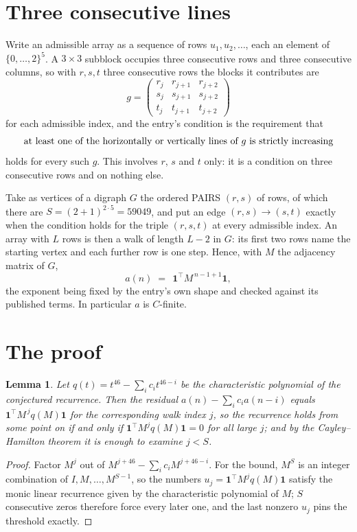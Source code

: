 \documentclass[11pt,a4paper]{article}
\theoremstyle{plain}
\newtheorem{lemma}[theorem]{Lemma}
\theoremstyle{definition}
\begin{document}
\section{Three consecutive lines}

Write an admissible array as a sequence of rows $u_1,u_2,\dots$, each an element of
$\{0,\dots,2\}^{5}$. A $3\times3$ subblock occupies three consecutive rows and
three consecutive columns, so with $r,s,t$ three consecutive rows the blocks it
contributes are
\[
g=\begin{pmatrix}r_j&r_{j+1}&r_{j+2}\\ s_j&s_{j+1}&s_{j+2}\\ t_j&t_{j+1}&t_{j+2}\end{pmatrix}
\]
for each admissible index, and the entry's condition is the requirement that
\[
\text{at least one}\text{ of the horizontally or vertically lines of }g\text{ \text{is strictly increasing}}
\]
holds for every such $g$. This involves $r$, $s$ and $t$ only: it is a condition on
three consecutive rows and on nothing else.

Take as vertices of a digraph $G$ the ordered PAIRS $(r,s)$ of rows, of which there are
$S=(2+1)^{2\cdot5}=59049$, and put an edge $(r,s)\to(s,t)$ exactly when the condition
holds for the triple $(r,s,t)$ at every admissible index. An array with $L$ rows is then a
walk of length $L-2$ in $G$: its first two rows name the starting vertex and each further
row is one step. Hence, with $M$ the adjacency matrix of $G$,
\[
a(n)\;=\;\,\mathbf{1}^{\!\top}M^{\,n-1+1}\mathbf{1},
\]
the exponent being fixed by the entry's own shape and checked against its published terms.
In particular $a$ is $C$-finite.

\section{The proof}

\begin{lemma}\label{lem:crit}
Let $q(t)=t^{46}-\sum_i c_it^{46-i}$ be the characteristic polynomial of the
conjectured recurrence. Then the residual $a(n)-\sum_ic_ia(n-i)$ equals
$\mathbf{1}^{\!\top}M^{\,j}q(M)\mathbf{1}$ for the corresponding walk index
$j$, so the recurrence holds from some point on if and only if
$\mathbf{1}^{\!\top}M^{j}q(M)\mathbf{1}=0$ for all large $j$; and by the
Cayley--Hamilton theorem it is enough to examine $j<S$.
\end{lemma}

\begin{proof}
Factor $M^{j}$ out of $M^{j+46}-\sum_ic_iM^{j+46-i}$. For the bound, $M^{S}$
is an integer combination of $I,M,\dots,M^{S-1}$, so the numbers
$u_j=\mathbf{1}^{\!\top}M^{j}q(M)\mathbf{1}$ satisfy the monic linear recurrence given by
the characteristic polynomial of $M$; $S$ consecutive zeros therefore force every later one,
and the last nonzero $u_j$ pins the threshold exactly.
\end{proof}
\end{document}
